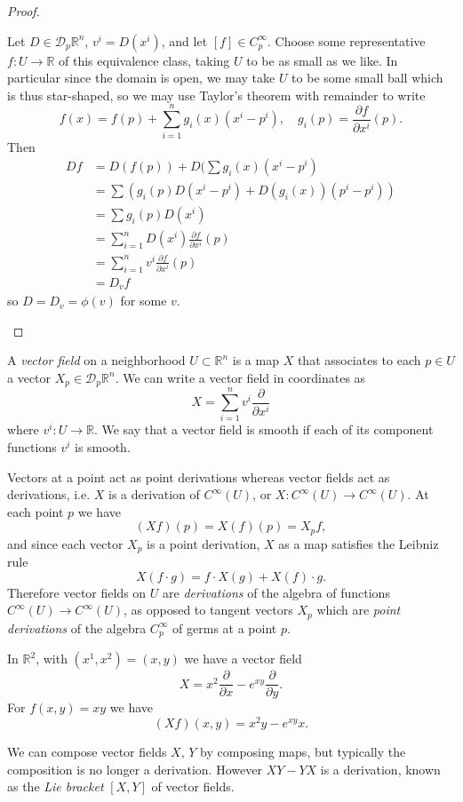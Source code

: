 \begin{proof}
\begin{itemize}
{    Let $D \in \mathcal{D}_p \mathbb{R}^n$, $v^i = D(x^i)$, and let
    $[f] \in C_p^\infty$. Choose some representative
    $f : U \to \mathbb{R}$ of this equivalence class, taking $U$ to be
    as small as we like. In particular since the domain is open, we
    may take $U$ to be some small ball which is thus star-shaped, so
    we may use Taylor's theorem with remainder to write
    $$
      f(x)
    = f(p)
    + \sum_{i=1}^n
        g_i(x)
        (x^i - p^i), \quad
      g_i(p)
    = \frac{\partial f}{\partial x^i}(p).
    $$
    Then
    \begin{align*}
       D f
    &= D(f(p))
     + D(\sum g_i (x) (x^i - p^i) \\
    &= \sum
         \left(
           g_i(p) D(x^i - p^i)
         + D(g_i(x))(p^i - p^i)
         \right) \\
    &= \sum
         g_i(p) D(x^i) \\
    &= \sum_{i=1}^n
         D(x^i)
         \frac{\partial f}
              {\partial x^i}(p) \\
    &= \sum_{i=1}^n
         v^i
         \frac{\partial f}
              {\partial x^i}(p) \\
    &= D_v f
    \end{align*}
    so $D = D_v = \phi(v)$ for some $v$.
  }
\end{itemize}
\end{proof}

\begin{defn}
A \emph{vector field} on a neighborhood $U \subset \mathbb{R}^n$ is a
map $X$ that associates to each $p \in U$ a vector
$X_p \in \mathcal{D}_p \mathbb{R}^n$. We can write a vector field in
coordinates as
$$
X = \sum_{i=1}^n v^i \frac{\partial}{\partial x^i}
$$
where $v^i : U \to \mathbb{R}$. We say that a vector field is smooth
if each of its component functions $v^i$ is smooth.
\end{defn}

Vectors at a point act as point derivations whereas vector fields act
as derivations, i.e. $X$ is a derivation of $C^\infty(U)$,
or $X: C^\infty(U) \to C^\infty(U)$. At each point $p$ we have
$$
(X f)(p) = X(f)(p)= X_p f,
$$
and since each vector $X_p$ is a point derivation, $X$ as a map
satisfies the Leibniz rule
$$
X (f \cdot g) = f \cdot X(g) + X(f) \cdot g.
$$
Therefore vector fields on $U$ are \emph{derivations} of the algebra of
functions $C^\infty(U) \to C^\infty(U)$, as opposed to tangent vectors $X_p$ which are
\emph{point derivations} of the algebra $C_p^\infty$ of germs at a
point $p$.

\begin{xmpl}
In $\mathbb{R}^2$, with $(x^1, x^2) = (x, y)$ we have a vector field
$$
X = x^2 \frac{\partial}{\partial x} - e^{xy} \frac{\partial}{\partial y}.
$$
For $f(x, y) = xy$ we have
$$
(Xf)(x, y) = x^2 y - e^{xy} x.
$$
\end{xmpl}

We can compose vector fields $X$, $Y$ by composing maps, but typically
the composition is no longer a derivation. However $XY - YX$ is a
derivation, known as the \emph{Lie bracket} $[X, Y]$ of vector fields.
